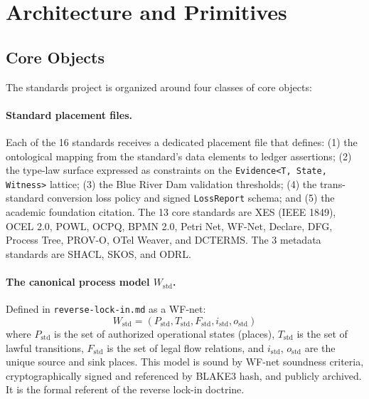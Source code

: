 
\section{Architecture and Primitives}
\label{sec:standards-arch}

\subsection{Core Objects}
\label{sec:standards-arch-objects}

The standards project is organized around four classes of core objects:

\paragraph{Standard placement files.}
Each of the 16 standards receives a dedicated placement file that defines: (1) the
ontological mapping from the standard's data elements to ledger assertions; (2) the
type-law surface expressed as constraints on the \texttt{Evidence<T, State, Witness>}
lattice; (3) the Blue River Dam validation thresholds; (4) the trans-standard conversion
loss policy and signed \texttt{LossReport} schema; and (5) the academic foundation
citation. The 13 core standards are XES (IEEE 1849), OCEL 2.0, POWL, OCPQ, BPMN 2.0,
Petri Net, WF-Net, Declare, DFG, Process Tree, PROV-O, OTel Weaver, and DCTERMS. The
3 metadata standards are SHACL, SKOS, and ODRL.

\paragraph{The canonical process model $W_{\text{std}}$.}
Defined in \texttt{reverse-lock-in.md} as a WF-net:
\begin{equation}
  W_{\text{std}} = (P_{\text{std}}, T_{\text{std}}, F_{\text{std}}, i_{\text{std}}, o_{\text{std}})
\end{equation}
where $P_{\text{std}}$ is the set of authorized operational states (places), $T_{\text{std}}$
is the set of lawful transitions, $F_{\text{std}}$ is the set of legal flow relations, and
$i_{\text{std}}$, $o_{\text{std}}$ are the unique source and sink places. This model is
sound by WF-net soundness criteria, cryptographically signed and referenced by BLAKE3 hash,
and publicly archived. It is the formal referent of the reverse lock-in doctrine.

